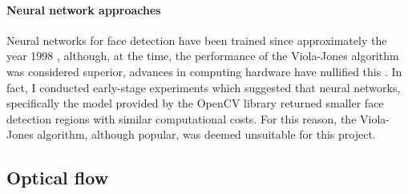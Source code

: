 

\paragraph{Neural network approaches}
Neural networks for face detection have been trained since approximately the year 1998 \cite{655647}, although, at the time, the performance of the Viola-Jones algorithm was considered superior, 
advances in computing hardware have nullified this \cite{v-j-vs-ann}. In fact, I conducted early-stage experiments which suggested that neural networks, specifically the model provided by the OpenCV library 
returned smaller face detection regions with similar computational costs. For this reason, the Viola-Jones algorithm, although popular, was deemed unsuitable for this project.

\subsection{Optical flow}


